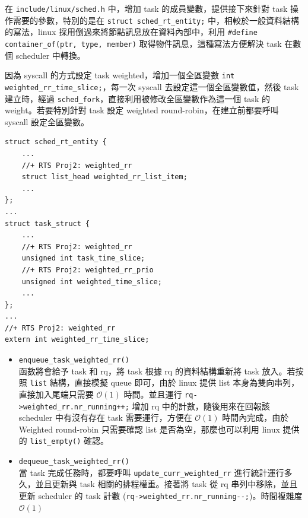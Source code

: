 \documentclass{res}
\begin{document}
\begin{resume}
在 \lstinline{include/linux/sched.h} 中，增加 task 的成員變數，提供接下來針對 task 操作需要的參數，特別的是在 \lstinline{struct sched_rt_entity;} 中，相較於一般資料結構的寫法，linux 採用倒過來將節點訊息放在資料內部中，利用 \lstinline{#define container_of(ptr, type, member)} 取得物件訊息，這種寫法方便解決 task 在數個 scheduler 中轉換。

因為 syscall 的方式設定 task weighted，增加一個全區變數 \lstinline{int weighted_rr_time_slice;}，每一次 syscall 去設定這一個全區變數值，然後 task 建立時，經過 \lstinline{sched_fork}，直接利用被修改全區變數作為這一個 task 的 weight。若要特別針對 task 設定 weighted round-robin，在建立前都要呼叫 syscall 設定全區變數。

\begin{lstlisting}[frame=single]
struct sched_rt_entity {
    ...
    //+ RTS Proj2: weighted_rr
    struct list_head weighted_rr_list_item;
    ...
};
...
struct task_struct {
    ...
    //+ RTS Proj2: weighted_rr
    unsigned int task_time_slice;
    //+ RTS Proj2: weighted_rr_prio
    unsigned int weighted_time_slice;
    ...
};
...
//+ RTS Proj2: weighted_rr
extern int weighted_rr_time_slice;
\end{lstlisting}

\vspace*{.1in} 

\vspace*{.05in} \hspace*{.1in} 

\begin{itemize}
	\item 
	\lstinline{enqueue_task_weighted_rr()} \\
	函數將會給予 task 和 rq，將 task 根據 rq 的資料結構重新將 task 放入。若按照 \lstinline{list} 結構，直接模擬 queue 即可，由於 linux 提供 list 本身為雙向串列，直接加入尾端只需要 $\mathcal{O}(1)$ 時間。並且運行 \lstinline{rq->weighted_rr.nr_running++;} 增加 rq 中的計數，隨後用來在回報該 scheduler 中有沒有存在 task 需要運行，方便在 $\mathcal{O}(1)$ 時間內完成，由於 Weighted round-robin 只需要確認 list 是否為空，那麼也可以利用 linux 提供的 \lstinline{list_empty()} 確認。
	
	\item
	\lstinline{dequeue_task_weighted_rr()} \\
	當 task 完成任務時，都要呼叫 \lstinline{update_curr_weighted_rr} 進行統計運行多久，並且更新與 task 相關的排程權重。接著將 task 從 rq 串列中移除，並且更新 scheduler 的 task 計數 (\lstinline{rq->weighted_rr.nr_running--;})。時間複雜度 $\mathcal{O}(1)$
	

\end{itemize}
\end{resume}
\end{document}
